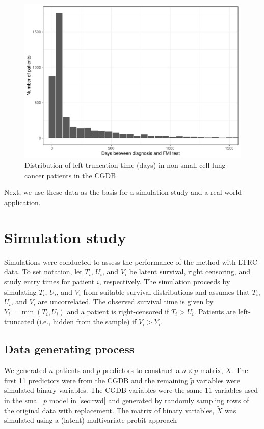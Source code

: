 \documentclass[11pt,final,fleqn]{article}\usepackage[]{graphicx}\usepackage[]{color}
\theoremstyle{plain}
\begin{document}
\begin{figure}[h]
 \centering
\includegraphics[max size={\textwidth}]{figs/left_trunc_hist.pdf} 
\caption{Distribution of left truncation time (days) in non-small cell lung cancer patients in the CGDB}
 \label{fig:left-trunc-time}
\end{figure}

Next, we use these data as the basis for a simulation study and a real-world application.

\section{Simulation study} \label{sec:simulation}
Simulations were conducted to assess the performance of the method with LTRC data. To set notation, let $T_i$, $U_i$, and $V_i$ be latent survival, right censoring, and study entry times for patient $i$, respectively. The simulation proceeds by simulating $T_i$, $U_i$, and $V_i$ from suitable survival distributions and assumes that $T_i$, $U_i$, and $V_i$ are uncorrelated. The observed survival time is given by $Y_i = \min(T_i, U_i)$ and a patient is right-censored if $T_i > U_i$. Patients are left-truncated (i.e., hidden from the sample) if $V_i > Y_i$. 

\subsection{Data generating process}
We generated $n$ patients and $p$ predictors to construct a $n \times p$ matrix, $X$. The first 11 predictors were from the CGDB and the remaining $\tilde{p}$ variables were simulated binary variables. The CGDB variables were the same $11$ variables used in the small $p$ model in \autoref{sec:rwd} and generated by randomly sampling rows of the original data with replacement. The matrix of binary variables, $\tilde{X}$ was simulated using a (latent) multivariate probit approach
\end{document}
